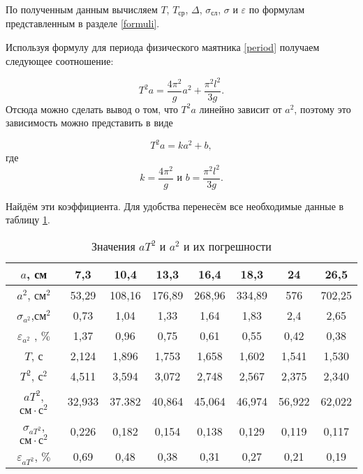 \documentclass[a4paper,12pt]{article} %
\begin{document}
По полученным данным вычисляем $ T $, $ T_\text{ср} $, $ \Delta $, $ \sigma_\text{сл}$, $ \sigma $ и $ \varepsilon $ по формулам представленным в разделе \ref{formuli}.

Используя формулу для периода физического маятника \eqref{period} получаем следующее соотношение:

\begin{equation}
T^2a=\frac{4\pi^2}{g}a^2+\frac{\pi^2l^2}{3g}.
\end{equation}
Отсюда можно сделать вывод о том, что $ T^2a $ линейно зависит от $ a^2 $, поэтому это зависимость можно представить в виде

\begin{equation}
T^2a=ka^2+b,
\end{equation}
где
\begin{equation}\label{koef}
k=\frac{4\pi^2}{g}  \text{ и }  b = \frac{\pi^2l^2}{3g}.
\end{equation}

Найдём эти коэффициента. Для удобства перенесём все необходимые данные в таблицу \ref{tab3}.


\begin{table}[h!]
    \begin{center}
	\begin{tabular}{|c|c|c|c|c|c|c|c|}
		\hline
		$ a $, см           & 7,3      & 10,4     & 13,3     & 16,4     & 18,3     & 24     & 26,5     \\ \hline
		$ a^2 $, $ \text{см}^2 $  & 53,29     & 108,16    & 176,89    & 268,96    & 334,89    & 576    & 702,25   \\ \hline
		$ \sigma_{a^2}$,$ \text{см}^2  $         & 0,73    & 1,04      & 1,33    & 1,64      & 1,83    & 2,4    & 2,65    \\ \hline
		$ \varepsilon_{a^2}$ , $ \% $         & 1,37    & 0,96      & 0,75    & 0,61      & 0,55    & 0,42    & 0,38    \\ \hline
		$ T $, с           & 2,124  & 1,896  & 1,753  & 1,658  & 1,602  & 1,541  & 1,530  \\ \hline
		$ T^2 $, $ \text{с}^2 $   & 4,511  & 3,594  & 3,072  & 2,748  & 2,567  & 2,375  & 2,340    \\ \hline
		$ aT^2 $, $ \text{см} \cdot \text{с}^2 $ & 32,933 & 37.382 & 40,864 & 45,064 & 46,974 & 56,922 & 62,022 \\ \hline
		$ \sigma_{aT^2} $, $ \text{см} \cdot \text{с}^2  $       & 0,226  & 0,182  & 0,154  & 0,138  & 0,129  & 0,119  & 0,117   \\ \hline
		$ \varepsilon_{aT^2} $, $ \% $       & 0,69  & 0,48  & 0,38  & 0,31  & 0,27  & 0,21  & 0,19  \\ \hline
	\end{tabular}
    \end{center}
\caption{Значения $ aT^2 $ и $ a^2 $ и их погрешности}
\label{tab3}
\end{table}
\end{document}
